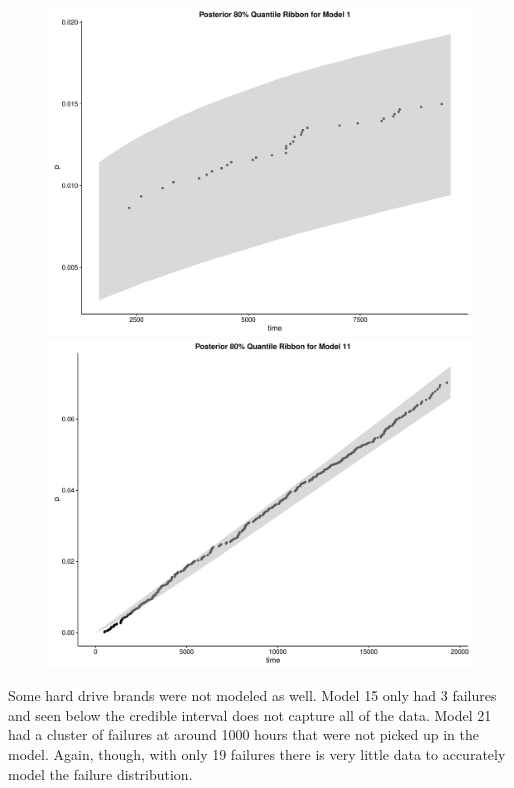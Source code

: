 \documentclass{scrartcl}
\begin{document}
\begin{figure}[H]
  \centering
  \begin{minipage}[b]{0.4\textwidth}
    \includegraphics[width=\textwidth]{plot1.pdf}
  \end{minipage}
  \hfill
  \begin{minipage}[b]{0.4\textwidth}
    \includegraphics[width=\textwidth]{plot2.pdf}
  \end{minipage}
\end{figure}

Some hard drive brands were not modeled as well.  Model 15 only had 3 failures and seen below the credible interval does not capture all of the data.  Model 21 had a cluster of failures at around 1000 hours that were not picked up in the model.  Again, though, with only 19 failures there is very little data to accurately model the failure distribution.  
\end{document}
